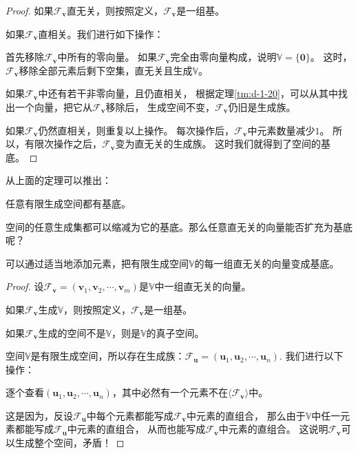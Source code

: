 \documentclass[12pt,UTF8]{ctexbook}
\begin{document}
\begin{appendix}
\begin{proof}
    如果$\mathcal{F}_{\mathbf{v}}$直无关，则按照定义，$\mathcal{F}_{\mathbf{v}}$是一组基。

    如果$\mathcal{F}_{\mathbf{v}}$直相关。我们进行如下操作：

    首先移除$\mathcal{F}_{\mathbf{v}}$中所有的零向量。
    如果$\mathcal{F}_{\mathbf{v}}$完全由零向量构成，说明$\mathbb{V} = \{\mathbf{0}\}$。
    这时，$\mathcal{F}_{\mathbf{v}}$移除全部元素后剩下空集，直无关且生成$\mathbb{V}$。

    如果$\mathcal{F}_{\mathbf{v}}$中还有若干非零向量，且仍直相关，
    根据定理\ref{tm:d-1-20}，可以从其中找出一个向量，把它从$\mathcal{F}_{\mathbf{v}}$移除后，
    生成空间不变，$\mathcal{F}_{\mathbf{v}}$仍旧是生成族。

    如果$\mathcal{F}_{\mathbf{v}}$仍然直相关，则重复以上操作。
    每次操作后，$\mathcal{F}_{\mathbf{v}}$中元素数量减少$1$。
    所以，有限次操作之后，$\mathcal{F}_{\mathbf{v}}$变为直无关的生成族。
    这时我们就得到了空间的基底。
\end{proof}

从上面的定理可以推出：
\begin{tm}\label{tm:d-1-50}
    任意有限生成空间都有基底。
\end{tm}

空间的任意生成集都可以缩减为它的基底。那么任意直无关的向量能否扩充为基底呢？
\begin{tm}\label{tm:d-1-60}
    可以通过适当地添加元素，把有限生成空间$\mathbb{V}$的每一组直无关的向量变成基底。
\end{tm}

\begin{proof}
    设$\mathcal{F}_{\mathbf{v}} = (\mathbf{v}_1, \mathbf{v}_2, \cdots , \mathbf{v}_m )$是$\mathbb{V}$中一组直无关的向量。

    如果$\mathcal{F}_{\mathbf{v}}$生成$\mathbb{V}$，则按照定义，$\mathcal{F}_{\mathbf{v}}$是一组基。

    如果$\mathcal{F}_{\mathbf{v}}$生成的空间不是$\mathbb{V}$，则是$\mathbb{V}$的真子空间。

    空间$\mathbb{V}$是有限生成空间，所以存在生成族：$\mathcal{F}_{\mathbf{u}} = (\mathbf{u}_1, \mathbf{u}_2, \cdots , \mathbf{u}_n )$. 我们进行以下操作：

    逐个查看$(\mathbf{u}_1, \mathbf{u}_2, \cdots , \mathbf{u}_n )$，其中必然有一个元素不在$\langle\mathcal{F}_{\mathbf{v}}\rangle$中。

    这是因为，反设$\mathcal{F}_{\mathbf{u}}$中每个元素都能写成$\mathcal{F}_{\mathbf{v}}$中元素的直组合，
    那么由于$\mathbb{V}$中任一元素都能写成$\mathcal{F}_{\mathbf{u}}$中元素的直组合，
    从而也能写成$\mathcal{F}_{\mathbf{v}}$中元素的直组合。
    这说明$\mathcal{F}_{\mathbf{v}}$可以生成整个空间，矛盾！


\end{proof}
\end{appendix}
\end{document}
